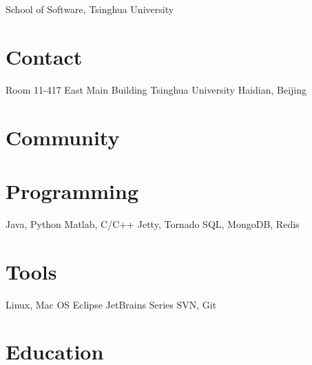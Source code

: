 \documentclass[]{friggeri-cv}
\begin{document}
       {School of Software, Tsinghua University}

\begin{aside}
  \section{Contact}
    Room 11-417
    East Main Building
    Tsinghua University
    Haidian, Beijing
  \section{Community}
  \section{Programming}
    Java, Python
    Matlab, C/C++
    Jetty, Tornado
    SQL, MongoDB, Redis
  \section{Tools}
    Linux, Mac OS
    Eclipse
    JetBrains Series
    SVN, Git
\end{aside}



\section{Education}
\end{document}
